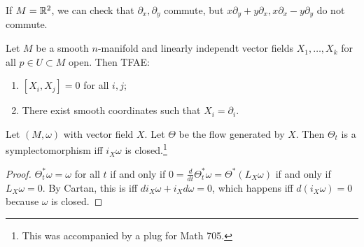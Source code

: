 \documentclass[twoside, 10pt]{article}
\begin{document}
    \begin{exm}
        If $M = \mathbb{R}^2$, we can check that $\partial_x, \partial_y$ commute, but $x \partial_y + y \partial_x, x\partial_x - y \partial_y$ do not commute.
    \end{exm}

    \begin{thm}
        Let $M$ be a smooth $n$-manifold and linearly independt vector fields $X_1, \ldots, X_{k}$ for all $p \in U \subset M$ open. Then TFAE:
        \begin{enumerate}
            \item $[X_i, X_j] = 0$ for all $i,j$;
            \item There exist smooth coordinates such that $X_i = \partial_i$.
        \end{enumerate}
    \end{thm}

    \begin{exm}
        Let $(M, \omega)$ with vector field $X$. Let $\Theta$ be the flow generated by $X$. Then $\Theta_t$ is a symplectomorphism iff $i_X \omega$ is closed.\footnote{This was accompanied by a plug for Math 705.}
    \end{exm}

    \begin{proof}
        $\Theta_t^* \omega = \omega$ for all $t$ if and only if $0 = \frac{d}{dt} \Theta_t^*\omega = \Theta^*(L_X \omega)$ if and only if $L_X \omega = 0$. By Cartan, this is iff $d i_X \omega + i_X d\omega = 0$, which happens iff $d(i_X \omega) = 0$ because $\omega$ is closed.
    \end{proof}
    
\end{document}
